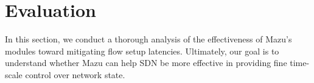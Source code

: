 \section{Evaluation}
\label{s:evaluation}

In this section, we conduct a thorough analysis of the effectiveness of Mazu's modules toward mitigating flow setup latencies. Ultimately, our goal is to understand whether Mazu can help SDN be more effective in providing fine time-scale control over network state.

%

